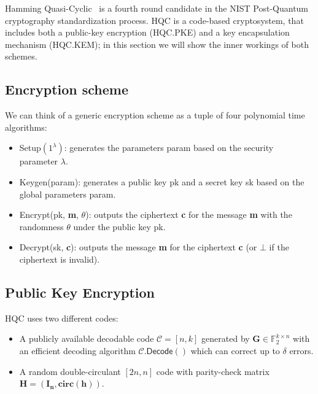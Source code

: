Hamming Quasi-Cyclic~\cite{melchor2018hamming} is a fourth round candidate in the NIST Post-Quantum cryptography standardization process.
HQC is a code-based cryptosystem, that includes both a public-key encryption (\textsf{HQC.PKE}) and a
key encapsulation mechanism (\textsf{HQC.KEM}); in this section we will show the inner workings of both schemes.

\subsection{Encryption scheme}\label{sec:encryption}
We can think of a generic encryption scheme as a tuple of four polynomial time algorithms:
\begin{itemize}
    \item \textsf{Setup}$(1^\lambda)$: generates the parameters \textsf{param} based on the security parameter $\lambda$.
    \item \textsf{Keygen(param)}: generates a public key \textsf{pk} and a secret key \textsf{sk} based on the global parameters \textsf{param}.
    \item \textsf{Encrypt(pk, \textbf{m}, $\theta$)}: outputs the ciphertext \textbf{c} for the message \textbf{m} with the randomness $\theta$ under the public key \textsf{pk}.
    \item \textsf{Decrypt(sk, \textbf{c})}: outputs the message \textbf{m} for the ciphertext \textbf{c} (or $\bot$ if the ciphertext is invalid).
\end{itemize}

\subsection{Public Key Encryption}\label{sec:pke}
HQC uses two different codes:
\begin{itemize}
    \item A publicly available decodable code $\mathcal{C} = [n, k]$ generated by $\mathbf{G} \in \mathds{F}_2^{k \times n}$  with an efficient decoding algorithm 
    $\mathcal{C}.\textsf{Decode}()$ which can correct up to $\delta$ errors.
    \item A random double-circulant $[2n,n]$ code with parity-check matrix $\mathbf{H} = (\mathbf{I_n, circ(h)})$. 
\end{itemize}

